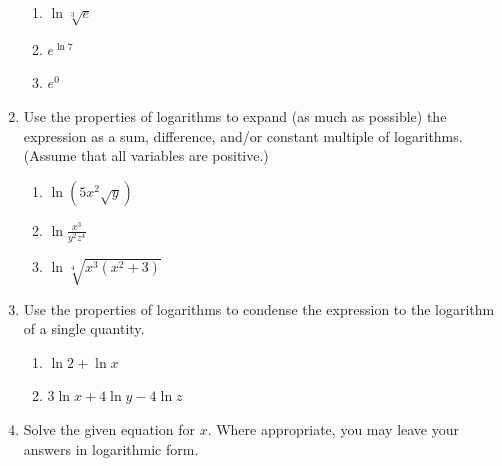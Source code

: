 \documentclass[12pt]{article}
\newif\ifans
\begin{document}
\begin{enumerate}
\begin{enumerate}
\item $\ln{\sqrt[3]{e}}$

\ifans\fbox{$\frac{1}{3}$} \fi

\item $e^{\ln{7}}$

\ifans\fbox{7}\fi

\item $e^0$

\ifans\fbox{1}\fi

\end{enumerate}

\item Use the properties of logarithms to expand (as much as possible) the expression as a sum, difference, and/or constant multiple of logarithms.  (Assume that all variables are positive.)

\begin{enumerate}

\item $\displaystyle \ln{(5x^{2}\sqrt{y})}$

\ifans\fbox{$\displaystyle \ln{5}+2\ln{x}+\frac{1}{2}\ln{y}$} \fi

\item $\displaystyle \ln{\frac{x^3}{y^2z^4}}$

\ifans\fbox{$\displaystyle 3\ln{x}-2\ln{y}-4\ln{z}$} \fi

\item $\displaystyle \ln{\sqrt[4]{x^{3}(x^{2}+3)}}$

\ifans\fbox{$\displaystyle \frac{3}{4}\ln{x}+\frac{1}{4}\ln{(x^{2}+3)}$} \fi

\end{enumerate}

\item Use the properties of logarithms to condense the expression to the logarithm of a single quantity.

\begin{enumerate}

\item $\displaystyle \ln{2}+\ln{x}$

\ifans\fbox{$\ln{(2x)}$} \fi
 
\item $\displaystyle 3\ln{x}+4\ln{y}-4\ln{z}$

\ifans\fbox{$\displaystyle \ln{\left(\frac{x^{3}y^{4}}{z^{4}}\right)}$} \fi

\end{enumerate}

\item Solve the given equation for $x$.  Where appropriate, you may leave your answers in logarithmic form.


\end{enumerate}
\end{document}
